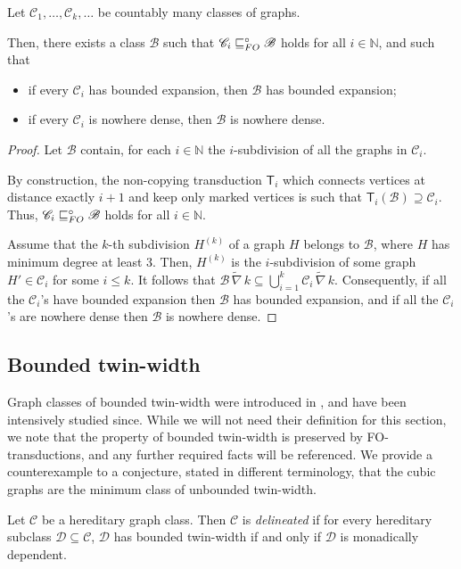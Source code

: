 \documentclass{lmcs}
\newcommand{\Cc}{\mathscr{C}}
\newcommand{\Dd}{\mathscr{D}}
\renewcommand{\FO}{{\rm FO}}
\theoremstyle{definition}
\begin{document}
\begin{lem}
	\label{lem:countBE}
	Let $\mathscr C_1,\dots,\mathscr C_k,\dots$ be countably many classes of graphs.
	
	Then, there exists a  class $\mathscr B$ such that $\mathscr C_i\sqsubseteq_\FO^\circ \mathscr B$ holds for all $i\in\mathbb N$, and such that
\begin{itemize}
	\item if every  $\Cc_i$ has bounded expansion, then $\mathscr B$ has bounded expansion;
\item if every $\Cc_i$ is nowhere dense, then $\mathscr B$ is nowhere dense.
\end{itemize}
\end{lem}
\begin{proof}
	Let $\mathscr B$ contain, for each $i\in\mathbb N$ the $i$-subdivision of all the graphs in $\mathscr C_i$. 
	
	By construction, the non-copying transduction $\mathsf T_i$ which connects vertices at distance exactly $i+1$ and keep only marked vertices is such that $\mathsf T_i(\mathscr B)\supseteq \mathscr C_i$. Thus, $\mathscr C_i\sqsubseteq_\FO^\circ \mathscr B$ holds for all $i\in\mathbb N$.
	
	Assume that the $k$-th subdivision $H^{(k)}$ of a graph $H$ belongs to $\mathscr B$, where $H$ has minimum degree at least $3$. Then, $H^{(k)}$ is the $i$-subdivision of some graph $H'\in\mathscr C_i$ for some $i\leq k$. It follows that 
	$\mathscr B\,\widetilde\nabla\,k\subseteq \bigcup_{i=1}^k \mathscr C_i\,\widetilde\nabla\,k$.
	Consequently, if all the $\mathscr C_i$'s  have bounded expansion then $\mathscr B$ has bounded expansion, and if all the $\mathscr C_i$'s  are nowhere dense then $\mathscr B$ is nowhere dense.
\end{proof}


\subsection{Bounded twin-width}
Graph classes of bounded twin-width were introduced in \cite{twin-width1}, and have been intensively studied since. While we will not need their definition for this section, we note that the property of bounded twin-width is preserved by FO-transductions, and any further required facts will be referenced. We provide a counterexample to a conjecture, stated in different terminology, that the cubic graphs are the minimum class of unbounded twin-width.

\begin{defi}
	Let $\Cc$ be a hereditary graph class. Then $\Cc$ is \emph{delineated} if for every hereditary subclass $\Dd \subseteq \Cc$, $\Dd$ has bounded twin-width if and only if $\Dd$ is monadically dependent.
	\end{defi}
\end{document}
